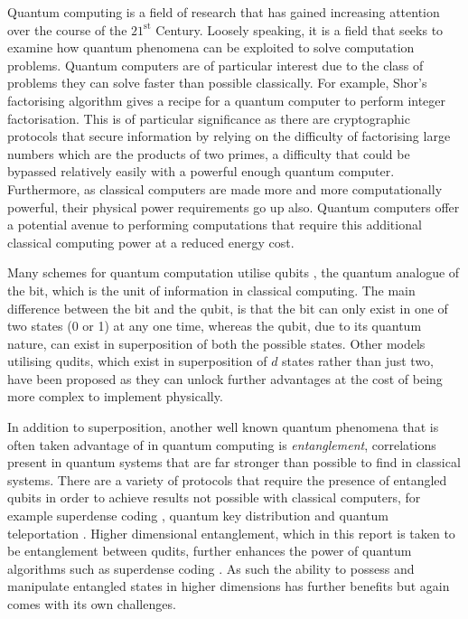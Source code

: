 Quantum computing is a field of research that has gained increasing attention over the course of the $21^{\text{st}}$ Century.
Loosely speaking, it is a field that seeks to examine how quantum phenomena can be exploited to solve computation problems.
Quantum computers are of particular interest due to the class of problems they can solve faster than possible classically.
For example, Shor's factorising algorithm \cite{Shor_1997} gives a recipe for a quantum computer to perform integer factorisation.
This is of particular significance as there are cryptographic protocols that secure information by relying on the difficulty of factorising large numbers which are the products of two primes, a difficulty that could be bypassed relatively easily with a powerful enough quantum computer.
Furthermore, as classical computers are made more and more computationally powerful, their physical power requirements go up also.
Quantum computers offer a potential avenue to performing computations that require this additional classical computing power at a reduced energy cost.

Many schemes for quantum computation utilise qubits \cite{li_2001}, the quantum analogue of the bit, which is the unit of information in classical computing.
The main difference between the bit and the qubit, is that the bit can only exist in one of two states (0 or 1) at any one time, whereas the qubit, due to its quantum nature, can exist in superposition of both the possible states.
Other models utilising qudits, which exist in superposition of $d$ states rather than just two, have been proposed \cite{Wang_2020} as they can unlock further advantages at the cost of being more complex to implement physically.

In addition to superposition, another well known quantum phenomena that is often taken advantage of in quantum computing is \emph{entanglement}, correlations present in quantum systems that are far stronger than possible to find in classical systems.
There are a variety of protocols that require the presence of entangled qubits in order to achieve results not possible with classical computers, for example superdense coding \cite{Superdense}, quantum key distribution \cite{qkd} and quantum teleportation \cite{qteleport}.
Higher dimensional entanglement, which in this report is taken to be entanglement between qudits, further enhances the power of quantum algorithms such as superdense coding \cite{Liu_2002}.
As such the ability to possess and manipulate entangled states in higher dimensions has further benefits but again comes with its own challenges. 

